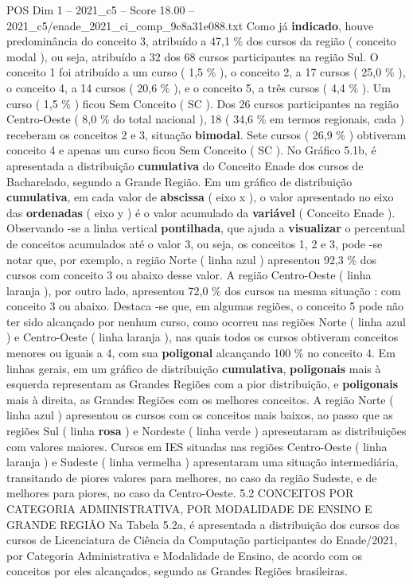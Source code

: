 \begin{textsample}{POS Dim 1 – 2021\_c5 – Score 18.00 – 2021\_c5/enade\_2021\_ci\_comp\_9c8a31e088.txt}
Como já \textbf{indicado}, houve predominância do conceito 3, atribuído a 47,1 \% dos cursos da região ( conceito modal ), ou seja, atribuído a 32 dos 68 cursos participantes na região Sul.
O conceito 1 foi atribuído a um curso ( 1,5 \% ), o conceito 2, a 17 cursos ( 25,0 \% ), o conceito 4, a 14 cursos ( 20,6 \% ), e o conceito 5, a três cursos ( 4,4 \% ).
Um curso ( 1,5 \% ) ficou Sem Conceito ( SC ).
Dos 26 cursos participantes na região Centro-Oeste ( 8,0 \% do total nacional ), 18 ( 34,6 \% em termos regionais, cada ) receberam os conceitos 2 e 3, situação \textbf{bimodal}.
Sete cursos ( 26,9 \% ) obtiveram conceito 4 e apenas um curso ficou Sem Conceito ( SC ).
No Gráfico 5.1b, é apresentada a distribuição \textbf{cumulativa} do Conceito Enade dos cursos de Bacharelado, segundo a Grande Região.
Em um gráfico de distribuição \textbf{cumulativa}, em cada valor de \textbf{abscissa} ( eixo x ), o valor apresentado no eixo das \textbf{ordenadas} ( eixo y ) é o valor acumulado da \textbf{variável} ( Conceito Enade ).
Observando -se a linha vertical \textbf{pontilhada}, que ajuda a \textbf{visualizar} o percentual de conceitos acumulados até o valor 3, ou seja, os conceitos 1, 2 e 3, pode -se notar que, por exemplo, a região Norte ( linha azul ) apresentou 92,3 \% dos cursos com conceito 3 ou abaixo desse valor.
A região Centro-Oeste ( linha laranja ), por outro lado, apresentou 72,0 \% dos cursos na mesma situação : com conceito 3 ou abaixo.
Destaca -se que, em algumas regiões, o conceito 5 pode não ter sido alcançado por nenhum curso, como ocorreu nas regiões Norte ( linha azul ) e Centro-Oeste ( linha laranja ), nas quais todos os cursos obtiveram conceitos menores ou iguais a 4, com sua \textbf{poligonal} alcançando 100 \% no conceito 4.
Em linhas gerais, em um gráfico de distribuição \textbf{cumulativa}, \textbf{poligonais} mais à esquerda representam as Grandes Regiões com a pior distribuição, e \textbf{poligonais} mais à direita, as Grandes Regiões com os melhores conceitos.
A região Norte ( linha azul ) apresentou os cursos com os conceitos mais baixos, ao passo que as regiões Sul ( linha \textbf{rosa} ) e Nordeste ( linha verde ) apresentaram as distribuições com valores maiores.
Cursos em IES situadas nas regiões Centro-Oeste ( linha laranja ) e Sudeste ( linha vermelha ) apresentaram uma situação intermediária, transitando de piores valores para melhores, no caso da região Sudeste, e de melhores para piores, no caso da Centro-Oeste. 5.2 CONCEITOS POR CATEGORIA ADMINISTRATIVA, POR MODALIDADE DE ENSINO E GRANDE REGIÃO Na Tabela 5.2a, é apresentada a distribuição dos cursos dos cursos de Licenciatura de Ciência da Computação participantes do Enade/2021, por Categoria Administrativa e Modalidade de Ensino, de acordo com os conceitos por eles alcançados, segundo as Grandes Regiões brasileiras.

\end{textsample}
